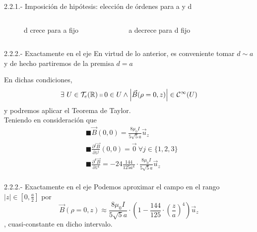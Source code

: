 \documentclass{beamer}
\providecommand{\difer}[3]{\frac{\partial^{#3} #1}{\partial #2^{#3}}}
\providecommand{\abs}[1]{\left|#1\right|}
\begin{document}
\begin{frame}{2.2.1.- Imposición de hipótesis: elección de órdenes para a y d}
\begin{columns}
         \begin{figure}
            \caption{d crece para a fijo}
            \label{Figura 1}
        \end{figure}
         \begin{figure}
            \caption{a decrece para d fijo}
            \label{Figura 2}
        \end{figure}
    \end{columns}
\end{frame}
\begin{frame}{2.2.2.- Exactamente en el eje}
    En virtud de lo anterior, es conveniente tomar $d \sim a$ y de hecho partiremos de la premisa $d = a$ \pause

    En dichas condiciones,
    \begin{equation}
        \exists~U \in \mathcal{T}_{e}(\mathbb{R}) \shortparallel 0 \in U \wedge \abs{\vec{B}(\rho = 0, z)} \in \mathcal{C}^{\infty}(U) \nonumber
    \end{equation}
    y podremos aplicar el Teorema de Taylor.\pause \\

    Teniendo en consideración que
    \begin{align*}
        & \blacksquare \vec{B}(0,0) = \frac{8\mu_{0}I}{5\sqrt{5}a} \vec{u}_{z} \nonumber \\
        & \blacksquare \frac{\partial^{j} \vec{B}}{\partial z^{j}} (0,0) = \vec{0}~\forall j \in \{1,2,3\}\\
        & \blacksquare \difer{\vec{B}}{z}{4} = - 24 \frac{144}{125a^{4}} \cdot \frac{8 \mu_{0} I}{5 \sqrt{5} a} \vec{u}_{z}\\
    \end{align*}
\end{frame}
\begin{frame}{2.2.2.- Exactamente en el eje}
    Podemos aproximar el campo en el rango $\abs{z} \in \left[ 0, \frac{a}{2} \right]$ por
    \begin{equation}
        \vec{B}(\rho=0,z) \approx \frac{8 \mu_{0} I}{5 \sqrt{5} a} \cdot \left( 1 - \frac{144}{125} \cdot \left( \frac{z}{a} \right)^{4} \right) \vec{u}_{z} \nonumber
    \end{equation}
    \pause, cuasi-constante en dicho intervalo.
\end{frame}
\end{document}
